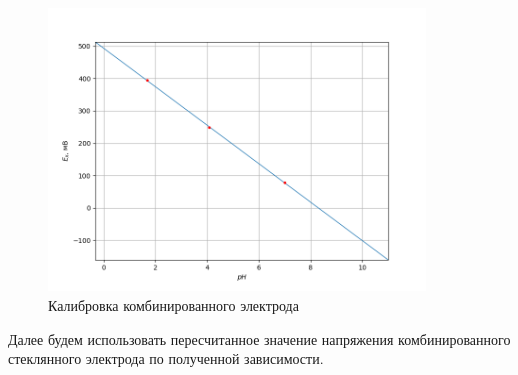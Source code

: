 \documentclass[a4paper,12pt]{article}
\begin{document}
\begin{figure}[h!]
    \centering
    \includegraphics[width=10cm]{Figure_1.png}
    \caption{Калибровка комбинированного электрода}
    \label{fig:vac}
\end{figure}

Далее будем использовать пересчитанное значение напряжения комбинированного стеклянного электрода по полученной зависимости.
\end{document}

